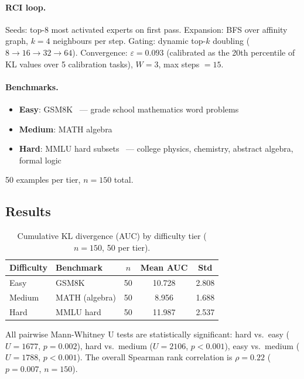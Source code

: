 \documentclass{article}
\begin{document}
\paragraph{RCI loop.}
Seeds: top-8 most activated experts on first pass.
Expansion: BFS over affinity graph, $k{=}4$ neighbours per step.
Gating: dynamic top-$k$ doubling ($8{\to}16{\to}32{\to}64$).
Convergence: $\varepsilon{=}0.093$ (calibrated as the 20th
percentile of KL values over 5 calibration tasks),
$W{=}3$, max steps $= 15$.

\paragraph{Benchmarks.}
\begin{itemize}
    \item \textbf{Easy}: GSM8K~\citep{cobbe2021gsm8k} ---
    grade school mathematics word problems
    \item \textbf{Medium}: MATH algebra~\citep{hendrycks2021math}
    \item \textbf{Hard}: MMLU hard subsets~\citep{hendrycks2021mmlu}
    --- college physics, chemistry, abstract algebra, formal logic
\end{itemize}
50 examples per tier, $n{=}150$ total.

\subsection{Results}

\begin{table}[ht]
\centering
\caption{Cumulative KL divergence (AUC) by difficulty tier
($n{=}150$, 50 per tier).}
\label{tab:results}
\begin{tabular}{llccc}
\toprule
Difficulty & Benchmark & $n$ & Mean AUC & Std \\
\midrule
Easy & GSM8K & 50 & 10.728 & 2.808 \\
Medium & MATH (algebra) & 50 & 8.956 & 1.688 \\
Hard & MMLU hard & 50 & 11.987 & 2.537 \\
\bottomrule
\end{tabular}
\end{table}

All pairwise Mann-Whitney U tests are statistically significant:
hard vs.\ easy ($U{=}1677$, $p{=}0.002$),
hard vs.\ medium ($U{=}2106$, $p{<}0.001$),
easy vs.\ medium ($U{=}1788$, $p{<}0.001$).
The overall Spearman rank correlation is
$\rho{=}0.22$ ($p{=}0.007$, $n{=}150$).
\end{document}
